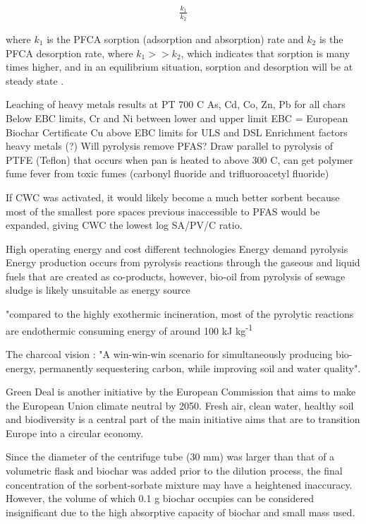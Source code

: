 \begin{align}
    \frac{k_1}{k_2}
\end{align}

where \(k_1\) is the PFCA sorption (adsorption and absorption) rate and \(k_2\) is the PFCA desorption rate, where \(k_1>>k_2\), which indicates that sorption is many times higher, and in an equilibrium situation, sorption and desorption will be at steady state \citep{Cornelissen2005}. 

Leaching of heavy metals results at PT 700 C
    As, Cd, Co, Zn, Pb for all chars Below EBC limits, Cr and Ni between lower and upper limit
    EBC = European Biochar Certificate
    Cu above EBC limits for ULS and DSL
    Enrichment factors heavy metals (?)
Will pyrolysis remove PFAS? Draw parallel to pyrolysis of PTFE (Teflon) that occurs when pan is heated to above 300 \textdegree C, can get polymer fume fever from toxic fumes (carbonyl fluoride and trifluoroacetyl fluoride)

If CWC was activated, it would likely become a much better sorbent because most of the smallest pore spaces previous inaccessible to PFAS would be expanded, giving CWC the lowest log SA/PV/C ratio.

High operating energy and cost different technologies \citep{Alhashimi2017}
Energy demand pyrolysis 
Energy production occurs from pyrolysis reactions through the gaseous and liquid fuels that are created as co-products, however, bio-oil from pyrolysis of sewage sludge is likely unsuitable as energy source

"compared to the highly exothermic incineration, most of the pyrolytic reactions are endothermic consuming energy of around 100 kJ kg\textsuperscript{-1}
 
The charcoal vision \citep{Laird2008}: "A win-win-win scenario for simultaneously producing bio-energy, permanently sequestering carbon, while improving soil and water quality".  

Green Deal is another initiative by the European Commission that aims to make the European Union climate neutral by 2050. Fresh air, clean water, healthy soil and biodiversity is a central part of the main initiative aims that are to transition Europe into a circular economy.

Since the diameter of the centrifuge tube (30 mm) was larger than that of a volumetric flask and biochar was added prior to the dilution process, the final concentration of the sorbent-sorbate mixture may have a heightened inaccuracy. However, the volume of which 0.1 g biochar occupies can be considered insignificant due to the high absorptive capacity of biochar and small mass used. 

